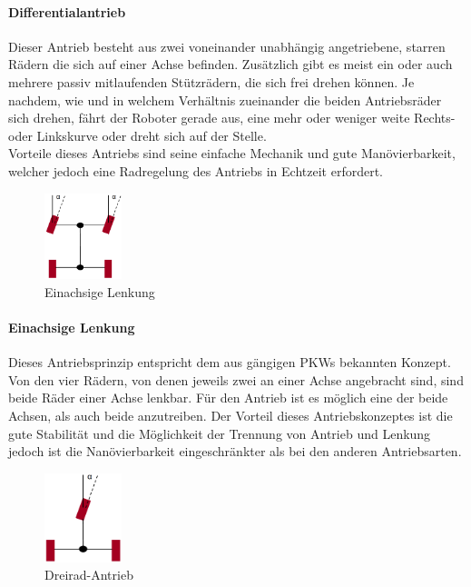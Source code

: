 \paragraph{Differentialantrieb}
Dieser Antrieb besteht aus zwei voneinander unabhängig angetriebene, starren Rädern die sich auf einer Achse befinden. Zusätzlich gibt es meist ein oder auch mehrere passiv mitlaufenden Stützrädern, die sich frei drehen können. Je nachdem, wie und in welchem Verhältnis zueinander die beiden Antriebsräder sich drehen, fährt der Roboter gerade aus, eine mehr oder weniger weite Rechts- oder Linkskurve oder dreht sich auf der Stelle.\\
Vorteile dieses Antriebs sind seine einfache Mechanik und gute Manövierbarkeit, welcher jedoch eine Radregelung des Antriebs in Echtzeit erfordert.
\begin{figure}
	\vspace{-0.25cm}
	\begin{center}
		\includegraphics[width=0.20\textwidth]{images/technische_grundlagen/Einachsenlenkung.png}
	\end{center}
	\caption{Einachsige Lenkung}
	\label{fig:einachsenlenkung}
\end{figure}
\paragraph{Einachsige Lenkung}
Dieses Antriebsprinzip entspricht dem aus gängigen PKWs bekannten Konzept. Von den vier Rädern, von denen jeweils zwei an einer Achse angebracht sind, sind beide Räder einer Achse lenkbar. Für den Antrieb ist es möglich eine der beide Achsen, als auch beide anzutreiben. 
\newline
Der Vorteil dieses Antriebskonzeptes ist die gute Stabilität und die Möglichkeit der Trennung von Antrieb und Lenkung jedoch ist die Nanövierbarkeit eingeschränkter als bei den anderen Antriebsarten.
\begin{figure}
	\vspace{+0.25cm}
	\begin{center}
		\includegraphics[width=0.20\textwidth]{images/technische_grundlagen/Dreiradantrieb.png}
	\end{center}
	\caption{Dreirad-Antrieb}
	\label{fig:einachsenlenkung}
\end{figure}
